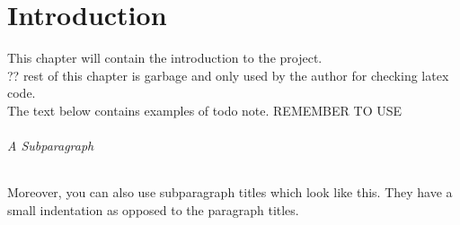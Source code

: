 \chapter{Introduction}\label{ch:introduction}
This chapter will contain the introduction to the project.\\

?? rest of this chapter is garbage and only used by the author for checking latex code.\\
The text below contains examples of todo note. REMEMBER TO USE 

\subparagraph{A Subparagraph} Moreover, you can also use subparagraph titles which look like this. They have a small indentation as opposed to the paragraph titles.

